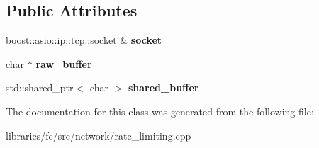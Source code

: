 \subsection*{Public Attributes}
\begin{DoxyCompactItemize}
\item 
\mbox{\label{classfc_1_1detail_1_1rate__limited__tcp__read__operation_a4c916b88d155e708d9a1962b360b723e}} 
boost\+::asio\+::ip\+::tcp\+::socket \& {\bfseries socket}
\item 
\mbox{\label{classfc_1_1detail_1_1rate__limited__tcp__read__operation_a13d0bf1fee25d9e43e8dadc16ed3e0f1}} 
char $\ast$ {\bfseries raw\+\_\+buffer}
\item 
\mbox{\label{classfc_1_1detail_1_1rate__limited__tcp__read__operation_a0828f567076e86c02d32596215fa9fb6}} 
std\+::shared\+\_\+ptr$<$ char $>$ {\bfseries shared\+\_\+buffer}
\end{DoxyCompactItemize}


The documentation for this class was generated from the following file\+:\begin{DoxyCompactItemize}
\item 
libraries/fc/src/network/rate\+\_\+limiting.\+cpp\end{DoxyCompactItemize}
